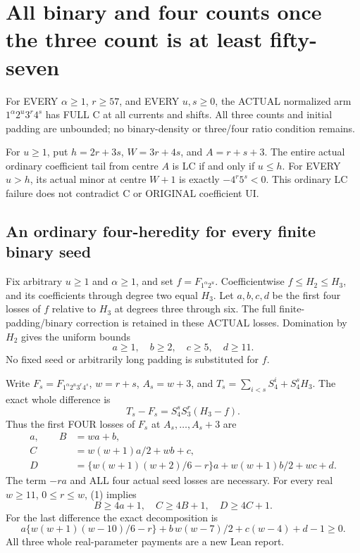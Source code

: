 \section{All binary and four counts once the three count is at least fifty-seven}
\begin{theorem}
For EVERY $\alpha\ge1$, $r\ge57$, and EVERY $u,s\ge0$, the
ACTUAL normalized arm $1^\alpha2^u3^r4^s$ has FULL C at all
currents and shifts. All three counts and initial padding are
unbounded; no binary-density or three/four ratio condition remains.
\end{theorem}
\begin{theorem}
For $u\ge1$, put $h=2r+3s$, $W=3r+4s$, and $A=r+s+3$.
The entire actual ordinary coefficient tail from centre $A$ is LC
if and only if $u\le h$. For EVERY $u>h$, its actual minor at
centre $W+1$ is exactly $-4^r5^s<0$.
This ordinary LC failure does not contradict C or ORIGINAL coefficient UI.
\end{theorem}

\subsection{An ordinary four-heredity for every finite binary seed}
Fix arbitrary $u\ge1$ and $\alpha\ge1$, and set
$f=F_{1^\alpha2^u}$. Coefficientwise $f\le H_2\le H_3$,
and its coefficients through degree two equal $H_3$.
Let $a,b,c,d$ be the first four losses of $f$ relative to $H_3$
at degrees three through six. The full finite-padding/binary
correction is retained in these ACTUAL losses. Domination by $H_2$
gives the uniform bounds
\[
                    a\ge1,\quad b\ge2,\quad c\ge5,\quad d\ge11.       \tag{1}
\]
No fixed seed or arbitrarily long padding is substituted for $f$.

Write $F_s=F_{1^\alpha2^u3^r4^s}$, $w=r+s$, $A_s=w+3$, and
$T_s=\sum_{i<s}S_4^i+S_4^sH_3$. The exact whole difference is
\[
                    T_s-F_s=S_4^sS_3^r(H_3-f).         \tag{2}
\]
Thus the first FOUR losses of $F_s$ at $A_s,\ldots,A_s+3$ are
\[
\begin{split}
 a,\qquad B&=wa+b,\\
 C&=w(w+1)a/2+wb+c,\\
 D&=\{w(w+1)(w+2)/6-r\}a+w(w+1)b/2+wc+d .
\end{split}                                                    \tag{3}
\]
The term $-ra$ and ALL four actual seed losses are necessary.
For every real $w\ge11$, $0\le r\le w$, (1) implies
\[
                  B\ge4a+1,\quad C\ge4B+1,\quad D\ge4C+1.            \tag{4}
\]
For the last difference the exact decomposition is
\[
 a\{w(w+1)(w-10)/6-r\}+b\,w(w-7)/2+c(w-4)+d-1\ge0.
\]
All three whole real-parameter payments are a new Lean report.

